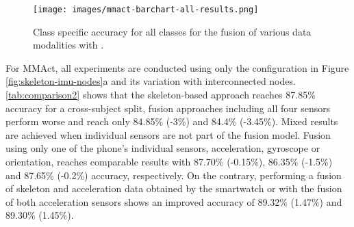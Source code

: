 \begin{figure}[ht]
    \centering
\texttt{[image: images/mmact-barchart-all-results.png]}
    \caption{Class specific accuracy for all \mmact{} classes for the fusion of various data modalities with \approachname{}.}
    \label{fig:mmact_barchart}
\end{figure}
For MMAct, all experiments are conducted using only the configuration in Figure \ref{fig:skeleton-imu-nodes}a and its variation with interconnected nodes. \tabname\ref{tab:comparison2} shows that the skeleton-based approach reaches 87.85\% accuracy for a cross-subject split, fusion approaches including all four sensors perform worse and reach only 84.85\% (-3\%) and 84.4\% (-3.45\%). Mixed results are achieved when individual sensors are not part of the fusion model. Fusion using only one of the phone's individual sensors, acceleration, gyroscope or orientation, reaches comparable results with 87.70\% (-0.15\%), 86.35\% (-1.5\%) and 87.65\% (-0.2\%) accuracy, respectively. On the contrary, performing a fusion of skeleton and acceleration data obtained by the smartwatch or with the fusion of both acceleration sensors shows an improved accuracy of 89.32\% (1.47\%) and 89.30\% (1.45\%).

